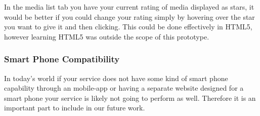 In the media list tab you have your current rating of media displayed as stars, it would be better if you could change your rating simply by hovering over the star you want to give it and then clicking. This could be done effectively in HTML5, however learning HTML5 was outside the scope of this prototype.

\subsubsection{Smart Phone Compatibility}
In today's world if your service does not have some kind of smart phone capability through an mobile-app or having a separate website designed for a smart phone your service is likely not going to perform as well. Therefore it is an important part to include in our future work.

